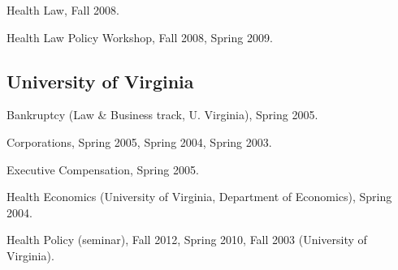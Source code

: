 \documentclass[11pt,letterpaper]{report}
\newcommand{\listitemspace}{0.25em}
\renewenvironment{itemize}
{\begin{list}{}{\setlength{\leftmargin}{0em}
                \setlength{\parskip}{0em}
                \setlength{\itemsep}{\listitemspace}
                \setlength{\parsep}{\listitemspace}}}
{\end{list}}
\begin{document}
    \begin{itemize}

        \item Health Law, Fall 2008. 
        \item Health Law Policy Workshop, Fall 2008, Spring 2009.

    \end{itemize}

    \subsection*{University of Virginia}

    \begin{itemize}

        \item Bankruptcy (Law \& Business track, U. Virginia), Spring 2005.
        \item Corporations, Spring 2005, Spring 2004, Spring 2003.
        \item Executive Compensation, Spring 2005. 
        \item Health Economics (University of Virginia, Department of Economics), Spring 2004. 
        \item Health Policy (seminar), Fall 2012, Spring 2010, Fall 2003 (University of Virginia). 

    \end{itemize}







\end{document}
